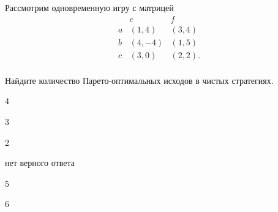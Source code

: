
\begin{question}
Рассмотрим одновременную игру с матрицей \[
\begin{matrix}
   & e & f \\
a  & (1, 4) & (3, 4) \\
b  & (4, -4) & (1, 5) \\
c  & (3, 0) & (2, 2). \\
\end{matrix}
\]

Найдите количество Парето-оптимальных исходов в чистых стратегиях.
\begin{answerlist}
  \item 4
  \item 3
  \item 2
  \item нет верного ответа
  \item 5
  \item 6
\end{answerlist}
\end{question}


